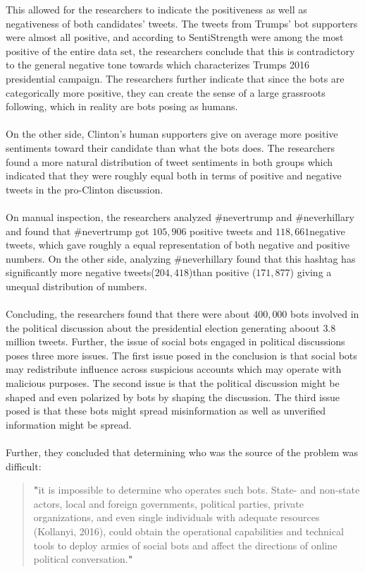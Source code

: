 This allowed for the researchers to indicate the positiveness as well as negativeness of both candidates' tweets. The tweets from Trumps' bot supporters were almost all positive, and  according to SentiStrength were among the most positive of the entire data set, the researchers conclude that this is contradictory to the general negative tone towards which characterizes Trumps 2016 presidential campaign. The researchers further indicate that since the bots are categorically more positive, they can create the sense of a large grassroots following, which in reality are bots posing as humans. 
\\
\\
On the other side, Clinton's human supporters give on average more positive sentiments toward their candidate than what the bots does. The researchers found a more natural distribution of tweet sentiments in both groups which indicated that they were roughly equal both in terms of positive and negative tweets in the pro-Clinton discussion. 
\\
\\
On manual inspection, the researchers analyzed \#nevertrump and \#neverhillary and found that \#nevertrump got $105,906$ \cite{Emil:FM7090}positive tweets and $118,661$\cite{Emil:FM7090}negative tweets, which gave roughly a equal representation of both negative and positive numbers. On the other side, analyzing \#neverhillary found that this hashtag has significantly more negative tweets($204,418$)than positive ($171,877$) \cite{Emil:FM7090} giving a unequal distribution of numbers.
\\
\\

Concluding, the researchers found that there were about $400,000$ bots involved in the political discussion about the presidential election generating aboout $3.8$ million tweets.
Further, the issue of social bots engaged in political discussions poses three more issues. The first issue posed in the conclusion is that social bots may redistribute influence across suspicious accounts which may operate with malicious purposes. The second issue is that the political discussion might be shaped and even polarized by bots by shaping the discussion. The third issue posed is that these bots might spread misinformation as well as unverified information might be spread.
\\
\\
Further, they concluded that determining who was the source of the problem was difficult:
\begin{quote}\label{Emil:conclusion:ownershipofBots}
\textbf{"}it is impossible to determine who operates such bots. State- and non-state actors, local and foreign governments, political parties, private organizations, and even single individuals with adequate resources (Kollanyi, 2016), could obtain the operational capabilities and technical tools to deploy armies of social bots and affect the directions of online political conversation.\textbf{"} \cite{Emil:FM7090}
\end{quote}



